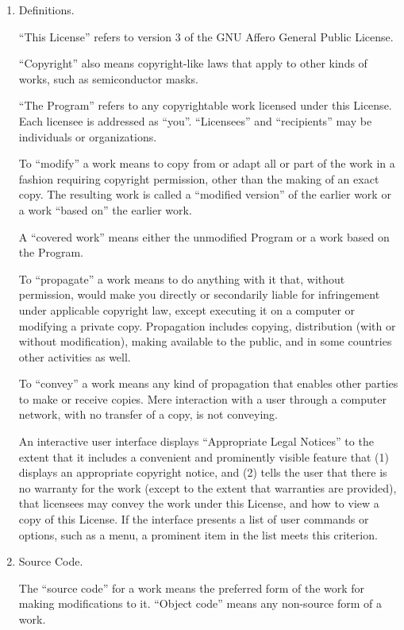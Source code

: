\documentclass{article}%
\begin{document}
\begin{enumerate}

\addtocounter{enumi}{-1}

\item Definitions.

``This License'' refers to version 3 of the GNU Affero General Public License.

``Copyright'' also means copyright-like laws that apply to other kinds of
works, such as semiconductor masks.

``The Program'' refers to any copyrightable work licensed under this
License.  Each licensee is addressed as ``you''.  ``Licensees'' and
``recipients'' may be individuals or organizations.

To ``modify'' a work means to copy from or adapt all or part of the work
in a fashion requiring copyright permission, other than the making of an
exact copy.  The resulting work is called a ``modified version'' of the
earlier work or a work ``based on'' the earlier work.

A ``covered work'' means either the unmodified Program or a work based
on the Program.

To ``propagate'' a work means to do anything with it that, without
permission, would make you directly or secondarily liable for
infringement under applicable copyright law, except executing it on a
computer or modifying a private copy.  Propagation includes copying,
distribution (with or without modification), making available to the
public, and in some countries other activities as well.

To ``convey'' a work means any kind of propagation that enables other
parties to make or receive copies.  Mere interaction with a user through
a computer network, with no transfer of a copy, is not conveying.

An interactive user interface displays ``Appropriate Legal Notices''
to the extent that it includes a convenient and prominently visible
feature that (1) displays an appropriate copyright notice, and (2)
tells the user that there is no warranty for the work (except to the
extent that warranties are provided), that licensees may convey the
work under this License, and how to view a copy of this License.  If
the interface presents a list of user commands or options, such as a
menu, a prominent item in the list meets this criterion.

\item Source Code.

The ``source code'' for a work means the preferred form of the work
for making modifications to it.  ``Object code'' means any non-source
form of a work.


\end{enumerate}
\end{document}
